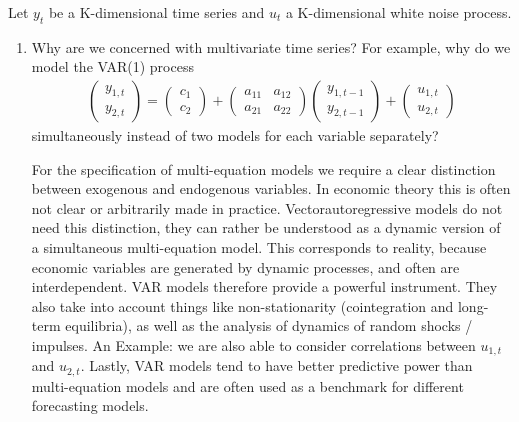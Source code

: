 Let $y_t$ be a K-dimensional time series and $u_t$ a K-dimensional white noise process.
\begin{enumerate}
    \item Why are we concerned with multivariate time series? For example, why do we model the VAR(1) process
          \begin{align*}
              \begin{pmatrix}y_{1,t}\\ y_{2,t}\end{pmatrix} = \begin{pmatrix} c_1 \\ c_2\end{pmatrix} + \begin{pmatrix}a_{11} & a_{12}\\ a_{21} & a_{22} \end{pmatrix} \begin{pmatrix}y_{1,{t-1}}\\ y_{2,{t-1}}\end{pmatrix} + \begin{pmatrix}u_{1,t}\\ u_{2,t}\end{pmatrix}
          \end{align*}
          simultaneously instead of two models for each variable separately?
          \begin{solution}
              For the specification of multi-equation models we require a clear distinction between exogenous and endogenous variables. In economic theory this is often not clear or arbitrarily made in practice. Vectorautoregressive models do not need this distinction, they can rather be understood as a dynamic version of a simultaneous multi-equation model. This corresponds to reality, because economic variables are generated by dynamic processes, and often are interdependent. VAR models therefore provide a powerful instrument. They also take into account things like non-stationarity (cointegration and long-term equilibria), as well as the analysis of dynamics of random shocks / impulses. An Example: we are also able to consider correlations between $ u_ {1, t} $ and $ u_ {2, t} $. Lastly, VAR models tend to have better predictive power than multi-equation models and are often used as a benchmark for different forecasting models.


\end{solution}
\end{enumerate}

